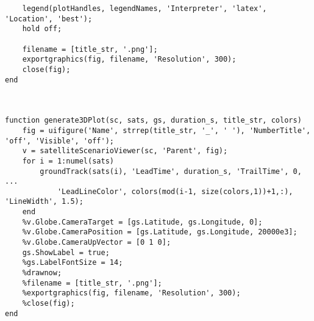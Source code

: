 \begin{verbatim}
    legend(plotHandles, legendNames, 'Interpreter', 'latex', 'Location', 'best');
    hold off;
    
    filename = [title_str, '.png'];
    exportgraphics(fig, filename, 'Resolution', 300);
    close(fig);
end



function generate3DPlot(sc, sats, gs, duration_s, title_str, colors)
    fig = uifigure('Name', strrep(title_str, '_', ' '), 'NumberTitle', 'off', 'Visible', 'off');
    v = satelliteScenarioViewer(sc, 'Parent', fig);
    for i = 1:numel(sats)
        groundTrack(sats(i), 'LeadTime', duration_s, 'TrailTime', 0, ...
            'LeadLineColor', colors(mod(i-1, size(colors,1))+1,:), 'LineWidth', 1.5);
    end
    %v.Globe.CameraTarget = [gs.Latitude, gs.Longitude, 0];
    %v.Globe.CameraPosition = [gs.Latitude, gs.Longitude, 20000e3];
    %v.Globe.CameraUpVector = [0 1 0];
    gs.ShowLabel = true;
    %gs.LabelFontSize = 14;
    %drawnow;
    %filename = [title_str, '.png'];
    %exportgraphics(fig, filename, 'Resolution', 300);
    %close(fig);
end

\end{verbatim}